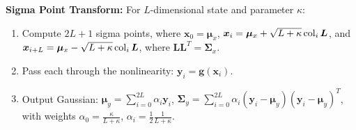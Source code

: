 \documentclass[twocolumn, 8pt]{extarticle}
\begin{document}
\textbf{Sigma Point Transform:} For $L$-dimensional state and parameter \(\kappa\):
\begin{enumerate}
  \item Compute $2L + 1$ sigma points, where \(\bm x_0 = \bm\mu _x\), \(\bm x_i = \bm\mu _x + \sqrt{L + \kappa}\operatorname{col}_i\bm L\),
        and \(\bm x_{i + L} = \bm\mu _x - \sqrt{L + \kappa}\operatorname{col}_i\bm L\), where \(\bm L\bm L^T = \bm\Sigma _x\).
	\item Pass each through the nonlinearity: $\bm y_i = \bm g(\bm x_i)$.
  \item Output Gaussian: \(\displaystyle \bm\mu _y = \sum _{i = 0}^{2L} \alpha _i\bm y_i\),
        \(\displaystyle \bm\Sigma _y = \sum _{i = 0}^{2L} \alpha _i(\bm y_i - \bm\mu _y)(\bm y_i - \bm\mu _y)^T\),
        with weights $\alpha_0 = \frac{\kappa}{L + \kappa}$, $\alpha _i = \frac{1}{2}\frac{1}{L + \kappa}$.
\end{enumerate}
\end{document}
